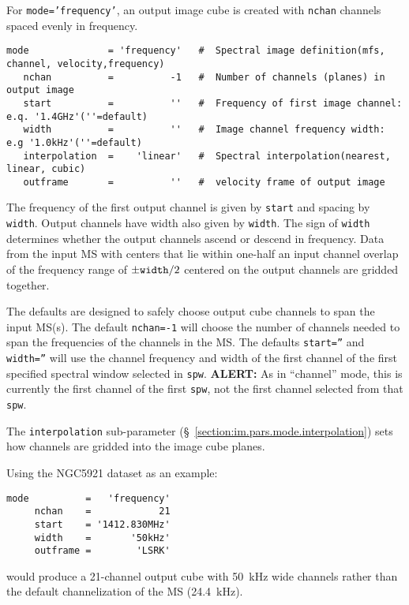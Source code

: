 For {\tt mode='frequency'}, an output image cube is created
with {\tt nchan} channels spaced evenly in frequency.
\small
\begin{verbatim}
mode              = 'frequency'   #  Spectral image definition(mfs, channel, velocity,frequency)
   nchan          =          -1   #  Number of channels (planes) in output image
   start          =          ''   #  Frequency of first image channel: e.q. '1.4GHz'(''=default)
   width          =          ''   #  Image channel frequency width: e.g '1.0kHz'(''=default)
   interpolation  =    'linear'   #  Spectral interpolation(nearest, linear, cubic)
   outframe       =          ''   #  velocity frame of output image
\end{verbatim}
\normalsize
The frequency of the first output channel is given by {\tt start}
and spacing by {\tt width}.  Output channels have width also given by {\tt width}.
The sign of {\tt width}
determines whether the output channels ascend or descend in
frequency.  Data from the input MS with centers that lie within one-half an input
channel overlap of the frequency range of $\pm{\tt width}/2$ centered
on the output channels are gridded together.  

The defaults are designed to safely choose output cube channels to
span the input MS(s).
The default {\tt nchan=-1} will choose the number of channels needed
to span the frequencies of the channels in the MS.  
The defaults {\tt start=''} and {\tt width=''} will use the channel
frequency and width of the first channel of the first specified
spectral window selected in {\tt spw}.  {\bf ALERT:} As in ``channel''
mode, this is currently the first channel of the first {\tt spw}, not
the first channel selected from that {\tt spw}.  

The {\tt interpolation} sub-parameter
(\S~\ref{section:im.pars.mode.interpolation}) sets how channels are
gridded into the image cube planes.

Using the NGC5921 dataset as an example:
\small
\begin{verbatim}
mode          =   'frequency'       
     nchan    =            21        
     start    = '1412.830MHz'     
     width    =       '50kHz'        
     outframe =        'LSRK'
\end{verbatim}
\normalsize
would produce a 21-channel output cube with 50~kHz wide channels
rather than the default channelization of the MS (24.4~kHz).


